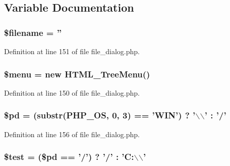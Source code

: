 \subsection{\-Variable \-Documentation}
\hypertarget{file__dialog_8php_a6b7de8d10c540db2f1631e68b2aa0538}{
\subsubsection[{\$filename}]{ \$filename = ''}}\label{file__dialog_8php_a6b7de8d10c540db2f1631e68b2aa0538}


\-Definition at line 151 of file file\-\_\-dialog.\-php.

\hypertarget{file__dialog_8php_a44b0c947ca193a7764153898f5336910}{
\subsubsection[{\$menu}]{\setlength{\rightskip}{0pt plus 5cm}\$menu = new {\bf \-H\-T\-M\-L\-\_\-\-Tree\-Menu}()}}\label{file__dialog_8php_a44b0c947ca193a7764153898f5336910}


\-Definition at line 150 of file file\-\_\-dialog.\-php.

\hypertarget{file__dialog_8php_a0504ca5eae7aa6afd25cce9724b68ec6}{
\subsubsection[{\$pd}]{\setlength{\rightskip}{0pt plus 5cm}\$pd = (substr(\-P\-H\-P\-\_\-\-O\-S, 0, 3) == '\-W\-I\-N') ? '$\backslash$$\backslash$' \-: '/'}}\label{file__dialog_8php_a0504ca5eae7aa6afd25cce9724b68ec6}


\-Definition at line 156 of file file\-\_\-dialog.\-php.

\hypertarget{file__dialog_8php_a31daebf88fc668f410293e2c70cea3fc}{
\subsubsection[{\$test}]{\setlength{\rightskip}{0pt plus 5cm}\${\bf test} = (\$pd == '/') ? '/' \-: '\-C\-:$\backslash$$\backslash$'}}\label{file__dialog_8php_a31daebf88fc668f410293e2c70cea3fc}


